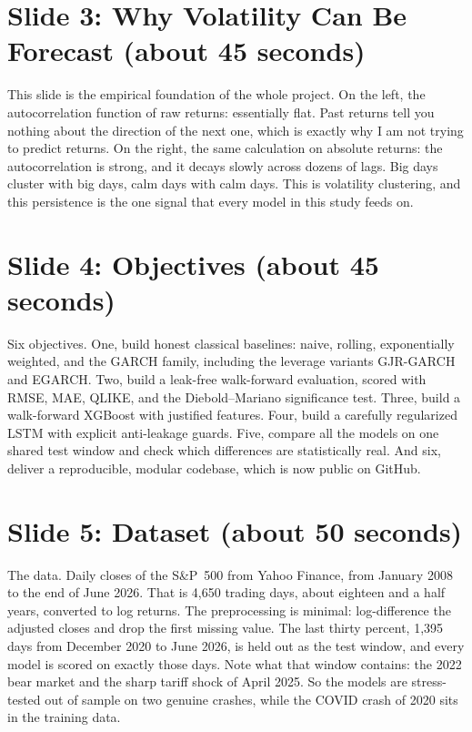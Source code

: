 \documentclass[a4paper,11pt]{article}
\begin{document}
\section*{Slide 3: Why Volatility Can Be Forecast (about 45 seconds)}

This slide is the empirical foundation of the whole project. On the left, the autocorrelation function of raw returns: essentially flat. Past returns tell you nothing about the direction of the next one, which is exactly why I am not trying to predict returns. On the right, the same calculation on absolute returns: the autocorrelation is strong, and it decays slowly across dozens of lags. Big days cluster with big days, calm days with calm days. This is volatility clustering, and this persistence is the one signal that every model in this study feeds on.

\section*{Slide 4: Objectives (about 45 seconds)}

Six objectives. One, build honest classical baselines: naive, rolling, exponentially weighted, and the GARCH family, including the leverage variants GJR-GARCH and EGARCH. Two, build a leak-free walk-forward evaluation, scored with RMSE, MAE, QLIKE, and the Diebold–Mariano significance test. Three, build a walk-forward XGBoost with justified features. Four, build a carefully regularized LSTM with explicit anti-leakage guards. Five, compare all the models on one shared test window and check which differences are statistically real. And six, deliver a reproducible, modular codebase, which is now public on GitHub.

\section*{Slide 5: Dataset (about 50 seconds)}

The data. Daily closes of the S\&P~500 from Yahoo Finance, from January 2008 to the end of June 2026. That is 4,650 trading days, about eighteen and a half years, converted to log returns. The preprocessing is minimal: log-difference the adjusted closes and drop the first missing value. The last thirty percent, 1,395 days from December 2020 to June 2026, is held out as the test window, and every model is scored on exactly those days. Note what that window contains: the 2022 bear market and the sharp tariff shock of April 2025. So the models are stress-tested out of sample on two genuine crashes, while the COVID crash of 2020 sits in the training data.
\end{document}
